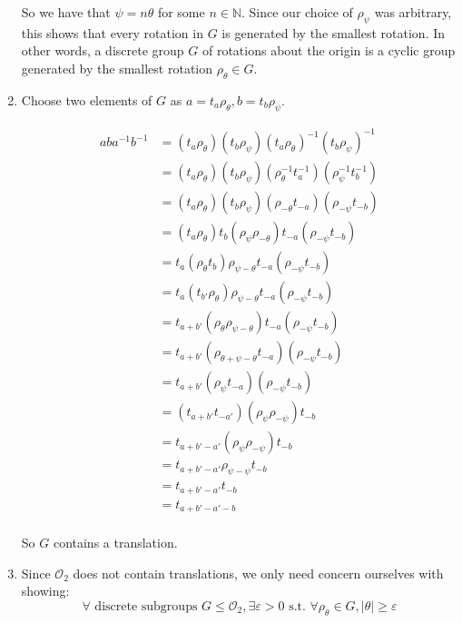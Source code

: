 \documentclass[12pt,letterpaper]{article}
\newcommand{\abs}[1]{\lvert#1\rvert}
\begin{document}
\begin{enumerate}
      So we have that $\psi = n \theta$ for some $n \in \mathbb{N}$.
      Since our choice of $\rho_\psi$ was arbitrary,
      this shows that every rotation in $G$ is generated by the smallest rotation.
      In other words, a discrete group $G$ of rotations about the origin is a cyclic group generated by the smallest rotation $\rho_\theta \in G$.

    \item
      Choose two elements of $G$ as $a = t_a \rho_\theta, b = t_b \rho_\psi$.

      \begin{align*}
        aba^{-1}b^{-1} &= (t_a \rho_\theta) (t_b \rho_\psi) (t_a \rho_\theta)^{-1} (t_b \rho_\psi)^{-1} \\
        &= (t_a \rho_\theta) (t_b \rho_\psi) (\rho_\theta^{-1} t_a^{-1}) (\rho_\psi^{-1} t_b^{-1}) \\
        &= (t_a \rho_\theta) (t_b \rho_\psi) (\rho_{-\theta} t_{-a}) (\rho_{-\psi} t_{-b}) \\
        &= (t_a \rho_\theta) t_b (\rho_\psi \rho_{-\theta}) t_{-a} (\rho_{-\psi} t_{-b}) \\
        &= t_a (\rho_\theta t_b) \rho_{\psi - \theta} t_{-a} (\rho_{-\psi} t_{-b}) \\
        &= t_a (t_{b'} \rho_\theta) \rho_{\psi - \theta} t_{-a} (\rho_{-\psi} t_{-b}) \\
        &= t_{a + b'} (\rho_\theta \rho_{\psi - \theta}) t_{-a} (\rho_{-\psi} t_{-b}) \\
        &= t_{a + b'} (\rho_{\theta + \psi - \theta} t_{-a}) (\rho_{-\psi} t_{-b}) \\
        &= t_{a + b'} (\rho_{\psi} t_{-a}) (\rho_{-\psi} t_{-b}) \\
        &= (t_{a + b'} t_{-a'}) (\rho_{\psi} \rho_{-\psi}) t_{-b} \\
        &= t_{a + b' - a'} (\rho_{\psi} \rho_{-\psi}) t_{-b} \\
        &= t_{a + b' - a'} \rho_{\psi - \psi} t_{-b} \\
        &= t_{a + b' - a'} t_{-b} \\
        &= t_{a + b' - a' -b} \\
      \end{align*}

      So $G$ contains a translation.

    \item
      Since $\mathcal{O}_2$ does not contain translations,
      we only need concern ourselves with showing:
      \[
        \forall \text{ discrete subgroups } G \le \mathcal{O}_2, \exists \varepsilon > 0 \text{ s.t. } \forall \rho_\theta \in G, \abs{\theta} \ge \varepsilon
      \]


\end{enumerate}
\end{document}
